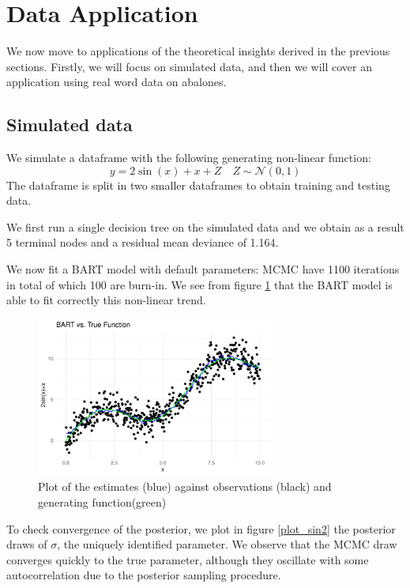 \documentclass[a4paper,11pt]{article}
\begin{document}
\section{Data Application}

We now move to applications of the theoretical insights derived in the previous sections. Firstly, we will focus on simulated data, and then we will cover an application using real word data on abalones.

\subsection{Simulated data}
We simulate a dataframe with the following generating non-linear function:
\begin{equation}
  y = 2\sin(x)+x+Z \quad Z \sim \mathcal{N}(0,1)
\end{equation}
The dataframe is split in two smaller dataframes to obtain training and testing data.

We first run a single decision tree on the simulated data and we obtain as a result 5 terminal nodes and a 
residual mean deviance of 1.164. 

We now fit a BART model with default parameters:  MCMC have 1100 iterations in total of which 100 are burn-in. We see from figure \ref{plot_sin1} that the BART model is able to fit correctly this non-linear trend.

\begin{figure}
  \centering
  \includegraphics[width=0.7\textwidth]{../outputs/sin_plot.pdf}
  \caption{Plot of the estimates (blue) against observations (black) and generating function(green)}
  \label{plot_sin1}
\end{figure}

To check convergence of the posterior, we plot in figure \ref{plot_sin2} the posterior draws of $\sigma$, the uniquely identified parameter. We observe that the MCMC draw converges quickly to the true parameter, although they oscillate with some autocorrelation due to the posterior sampling procedure.
\end{document}
